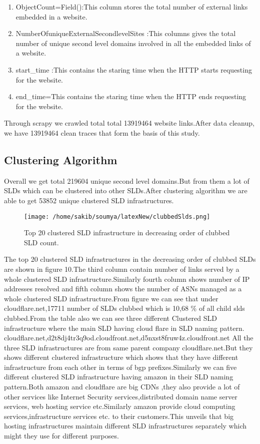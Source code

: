 \begin{enumerate}
\item ObjectCount=Field():This column stores the total number of external links embedded in a website.
\item NumberOfuniqueExternalSecondlevelSites :This columns gives the total number of unique second level domains involved in all the embedded links of a website.
    \item start\_time :This contains the staring time when the HTTP starts requesting for the website.
    \item end\_time=This contains the staring time when the HTTP ends requesting for the website.
    \end{enumerate}

Through scrapy we crawled total total 13919464 website links.After data cleanup, we have 13919464 clean traces that form the basis of this study.

\subsection{Clustering Algorithm}
Overall we get total 219604 unique second level domains.But from them a lot of SLDs which can be clustered into other SLDs.After clustering algorithm we are able to get 53852 unique clustered SLD infrastructures.

\begin{figure}[h]
\texttt{[image: /home/sakib/soumya/latexNew/clubbedSlds.png]}
\centering
\caption{Top 20 clustered SLD infrastructure in decreasing order of clubbed SLD count.}
\end{figure}

The top 20 clustered SLD infrastructures in the decreasing order of clubbed SLDs are shown in figure 10.The third column contain number of links served by a whole clustered SLD infrastructure.Similarly fourth column shows number of IP addresses resolved and fifth column shows the number of ASNs managed as a whole clustered SLD infrastructure.From figure we can see that under cloudflare.net,17711 number of SLDs clubbed which is  10,68 \% of all child slds clubbed.From the table also we can see three different Clustered SLD infrastructure where the main SLD having cloud flare in SLD naming pattern. cloudflare.net,d2t8dj4tr3q9od.cloudfront.net,d5nxst8fruw4z.cloudfront.net
All the three SLD infrastructures are from same parent company cloudflare.net.But they shows different clustered infrastructure which shows that they have different infrastructure from each other in terms of bgp prefixes.Similarly we can five different clustered SLD infrastructure having amazon in their SLD naming pattern.Both amazon and cloudflare are big CDNs ,they also provide a lot of other services like  Internet Security services,distributed domain name server services, web hosting service etc.Similarly amazon provide cloud computing services,infrastructure services etc. to their customers.This unveils that big hosting infrastructures maintain different SLD infrastructures separately which might they use for different purposes. 

